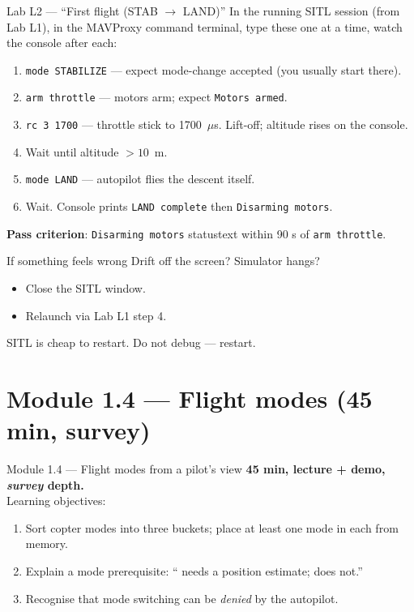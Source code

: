 \documentclass[aspectratio=169,11pt]{beamer}
\begin{document}
\begin{frame}{Lab L2 --- ``First flight (STAB $\rightarrow$ LAND)''}
  In the running SITL session (from Lab L1), in the MAVProxy command terminal, type these one at a time, watch the console after each:
  \begin{enumerate}
    \item \texttt{mode STABILIZE} --- expect mode-change accepted (you usually start there).
    \item \texttt{arm throttle} --- motors arm; expect \texttt{Motors armed}.
    \item \texttt{rc 3 1700} --- throttle stick to 1700~$\mu$s. Lift-off; altitude rises on the console.
    \item Wait until altitude $> 10$~m.
    \item \texttt{mode LAND} --- autopilot flies the descent itself.
    \item Wait. Console prints \texttt{LAND complete} then \texttt{Disarming motors}.
  \end{enumerate}
  \textbf{Pass criterion}: \texttt{Disarming motors} statustext within 90 s of \texttt{arm throttle}.
\end{frame}

\begin{frame}{If something feels wrong}
  Drift off the screen? Simulator hangs?
  \begin{itemize}
    \item Close the SITL window.
    \item Relaunch via Lab L1 step 4.
  \end{itemize}
  SITL is cheap to restart. Do not debug --- restart.
\end{frame}

\section{Module 1.4 --- Flight modes (45 min, survey)}

\begin{frame}{Module 1.4 --- Flight modes from a pilot's view}
  \textbf{45 min, lecture + demo, \emph{survey} depth.}\\[1ex]
  Learning objectives:
  \begin{enumerate}
    \item Sort copter modes into three buckets; place at least one mode in each from memory.
    \item Explain a mode prerequisite: `` needs a position estimate;  does not.''
    \item Recognise that mode switching can be \emph{denied} by the autopilot.
  \end{enumerate}
\end{frame}
\end{document}
